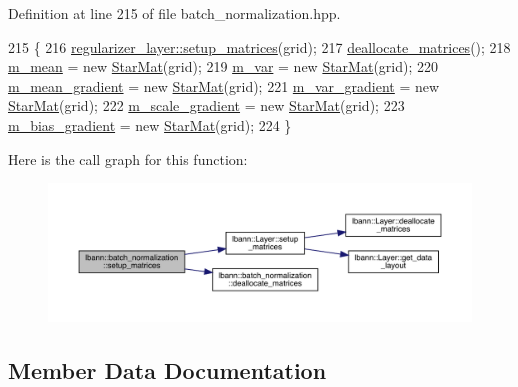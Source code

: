 Definition at line 215 of file batch\+\_\+normalization.\+hpp.


\begin{DoxyCode}
215                                                    \{
216     \hyperlink{classlbann_1_1Layer_a57bbe21131dc00ab5cf9ea5e3656808e}{regularizer\_layer::setup\_matrices}(grid);
217     \hyperlink{classlbann_1_1batch__normalization_ac98f8fbb6e5ea998a06cef2c2cac9f03}{deallocate\_matrices}();
218     \hyperlink{classlbann_1_1batch__normalization_a7c0db2315a4c5bb662da7a740ae76e24}{m\_mean} = \textcolor{keyword}{new} \hyperlink{base_8hpp_aba08580d21767b53d0737e115d738dbe}{StarMat}(grid);
219     \hyperlink{classlbann_1_1batch__normalization_aba533149e4179378ab23443b0a2a7dc6}{m\_var} = \textcolor{keyword}{new} \hyperlink{base_8hpp_aba08580d21767b53d0737e115d738dbe}{StarMat}(grid);
220     \hyperlink{classlbann_1_1batch__normalization_aa4677c2f7d5ea27c53bf0f61f280a2a3}{m\_mean\_gradient} = \textcolor{keyword}{new} \hyperlink{base_8hpp_aba08580d21767b53d0737e115d738dbe}{StarMat}(grid);
221     \hyperlink{classlbann_1_1batch__normalization_aa2d2050a265eed854aa8950cd1461af9}{m\_var\_gradient} = \textcolor{keyword}{new} \hyperlink{base_8hpp_aba08580d21767b53d0737e115d738dbe}{StarMat}(grid);
222     \hyperlink{classlbann_1_1batch__normalization_a66364e1b0c9afb40a4c03ee1869d264c}{m\_scale\_gradient} = \textcolor{keyword}{new} \hyperlink{base_8hpp_aba08580d21767b53d0737e115d738dbe}{StarMat}(grid);
223     \hyperlink{classlbann_1_1batch__normalization_aa0f1e9a9f48f67544618e239167494bb}{m\_bias\_gradient} = \textcolor{keyword}{new} \hyperlink{base_8hpp_aba08580d21767b53d0737e115d738dbe}{StarMat}(grid);
224   \}
\end{DoxyCode}
Here is the call graph for this function\+:\nopagebreak
\begin{figure}[H]
\begin{center}
\leavevmode
\includegraphics[width=350pt]{classlbann_1_1batch__normalization_a4ddf27efaf48f0726dc4356a3a0b40a9_cgraph}
\end{center}
\end{figure}


\subsection{Member Data Documentation}
\mbox{\label{classlbann_1_1batch__normalization_aa0f1e9a9f48f67544618e239167494bb}} 
